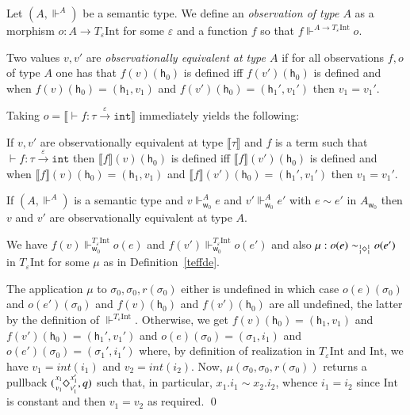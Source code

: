 \documentclass[orivec]{llncs}
\newcommand{\keywd}[1]{\mathtt{#1}}
\newcommand{\sq}[4]{\tensor*[^{#1}_{#2}]{\Diamond}{^{#3}_{#4}}}
\newcommand{\intt}[1]{\textit{int}(#1)}
\newcommand{\effto}[1]{\stackrel{#1}{\to}}
\newcommand{\inttype}{\keywd{int}}
\newcommand{\eff}{\varepsilon}
\newcommand{\sem}[1]{\ensuremath{\llbracket {#1} \rrbracket}}
\renewenvironment{proof}{\vspace{-1mm} \noindent {\bf Proof}\quad}{\qed}
\newcommand\w{\ensuremath{\mathsf{w}}\xspace}
\newcommand\heap{\ensuremath{\mathsf{h}}\xspace}
\begin{document}
\begin{definition}
  Let $(A,\Vdash^A)$ be a semantic type.  We define an
  \emph{observation of type $A$} as a morphism $o:A\rightarrow T_\eff
  \mathrm{Int}$ for some $\eff$ and a function $f$ so that
  $f\Vdash^{A\rightarrow T_\eff\mathrm{Int}}o$.

  Two values $v,v'$ are \emph{observationally equivalent at type $A$}
  if for all observations $f,o$ of type $A$ one has that $f(v)(\heap_0)$ is
  defined iff $f(v')(\heap_0)$ is defined and when
  $f(v)(\heap_0)=(\heap_1,v_1)$ and $f(v')(\heap_0)=(\heap_1',v_1')$
  then $v_1=v_1'$.
\end{definition}
Taking $o=\sem{\vdash f:\tau\effto\eff\inttype}$ immediately yields the following:
\begin{proposition}
If $v,v'$ are observationally equivalent at type $\sem{\tau}$ and $f$ is a
term such that $\vdash f:\tau\effto\eff\inttype$ then $\sem{f}(v)(\heap_0)$
is
  defined iff $\sem{f}(v')(\heap_0)$ is defined and when
  $\sem{f}(v)(\heap_0)=(\heap_1,v_1)$ and
$\sem{f}(v')(\heap_0)=(\heap_1',v_1')$
  then $v_1=v_1'$.
\end{proposition}
\begin{theorem}
\label{thm:obs-equivalence}\label{obseq}
If $(A,\Vdash^A)$ is a semantic type and $v\Vdash^A_{\w_0}e$ and
$v'\Vdash^A_{\w_0}e'$ with $e\sim e'$ in $A_{\w_0}$ then $v$ and  $v'$ are
observationally equivalent at type $A$. 
\end{theorem}
\begin{proof}
  We have $f(v)\Vdash^{T_\eff \mathrm{Int}}_{\w_0} o(e)$ and $f(v')\Vdash^{T_\eff \mathrm{Int}}_{\w_0} o(e')$ and also $\mu: 
o(e)\sim_{\sq{1}{1}{1}{1}} o(e')$ in $T_\eff\mathrm{Int}$ for some $\mu$ as in Definition~\ref{teffde}.

The application $\mu$ to $\sigma_0,\sigma_0,r(\sigma_0)$ either is
undefined in which case $o(e)(\sigma_0)$ and $o(e')(\sigma_0)$ and
$f(v)(\heap_0)$ and $f(v')(\heap_0)$ are all undefined, the latter by
the definition of $\Vdash^{T_\eff \mathrm{Int}}$. Otherwise, we get
$f(v)(\heap_0)=(\heap_1,v_1)$ and $f(v')(\heap_0)=(\heap_1',v_1')$ and
$o(e)(\sigma_0)=(\sigma_1,i_1)$ and $o(e')(\sigma_0)=(\sigma_1',i_1')$
where, by definition of realization in $T_\eff\mathrm{Int}$ and
$\mathrm{Int}$, we have $v_1=\intt{i_1}$ and $v_2=\intt{i_2}$. Now,
$\mu(\sigma_0,\sigma_0,r(\sigma_0))$ returns a pullback
$(\sq{x_1}{v_1}{x_1'}{v_1'},q)$ such that, in particular, $x_1.i_1\sim
x_2.i_2$, whence $i_1=i_2$ since $\mathrm{Int}$ is constant and then
$v_1=v_2$ as required.
\end{proof}
\end{document}
